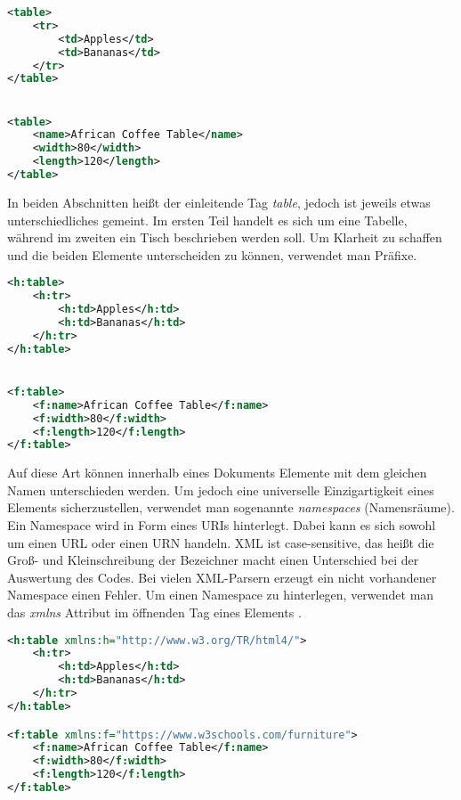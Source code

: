 \begin{lstlisting}[title=Beispiel Überschneidung von \ac{XML}-Bezeichnern, language=XML,  morekeywords={table, tr, td, name, width, length}]
<table>
	<tr>
		<td>Apples</td>
		<td>Bananas</td>
	</tr>
</table>


<table>
	<name>African Coffee Table</name>
	<width>80</width>
	<length>120</length>
</table>
\end{lstlisting}

In beiden Abschnitten heißt der einleitende Tag \textit{table}, jedoch ist jeweils etwas unterschiedliches gemeint. Im ersten Teil handelt es sich um eine Tabelle, während im zweiten ein Tisch beschrieben werden soll. Um Klarheit zu schaffen und die beiden Elemente unterscheiden zu können, verwendet man Präfixe. \\

\begin{lstlisting}[title=Lösung des Namenskonfliktes durch Verwendung der Präfixe \textit{h:} und \textit{f:}, language=XML,  morekeywords={h:table, h:tr, h:td, f:name, f:width, f:length, f:table}]
<h:table>
	<h:tr>
		<h:td>Apples</h:td>
		<h:td>Bananas</h:td>
	</h:tr>
</h:table>


<f:table>
	<f:name>African Coffee Table</f:name>
	<f:width>80</f:width>
	<f:length>120</f:length>
</f:table>
\end{lstlisting}

Auf diese Art können innerhalb eines Dokuments Elemente mit dem gleichen Namen unterschieden werden. Um jedoch eine universelle Einzigartigkeit eines Elements sicherzustellen, verwendet man sogenannte \textit{namespaces} (Namensräume). Ein Namespace wird in Form eines \acp{URI} hinterlegt. Dabei kann es sich sowohl um einen \ac{URL} oder einen \ac{URN} handeln. \ac{XML} ist case-sensitive, das heißt die Groß- und Kleinschreibung der Bezeichner macht einen Unterschied bei der Auswertung des Codes. Bei vielen \ac{XML}-Parsern erzeugt ein nicht vorhandener Namespace einen Fehler.
Um einen Namespace zu hinterlegen, verwendet man das \textit{xmlns} Attribut im öffnenden Tag eines Elements \cite{undxml}. \\ 

\begin{lstlisting}[title=Verwendung von \textit{namespaces} Möglichkeit 1, language=XML, morekeywords={h:table, xmlns:h, h:tr, h:td, f:table, xmlns:f, f:name, f:width, f:length}]
<h:table xmlns:h="http://www.w3.org/TR/html4/">
	<h:tr>
		<h:td>Apples</h:td>
		<h:td>Bananas</h:td>
	</h:tr>
</h:table>

<f:table xmlns:f="https://www.w3schools.com/furniture">
	<f:name>African Coffee Table</f:name>
	<f:width>80</f:width>
	<f:length>120</f:length>
</f:table>
\end{lstlisting}

